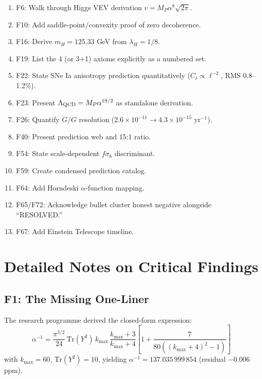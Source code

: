 \documentclass[11pt,a4paper]{article}
\begin{document}
\begin{enumerate}
\item F6: Walk through Higgs VEV derivation $v = M_P\alpha^8\sqrt{2\pi}$.
\item F10: Add saddle-point/convexity proof of zero decoherence.
\item F16: Derive $m_H = 125.33$ GeV from $\lambda_H = 1/8$.
\item F19: List the 4 (or 3+1) axioms explicitly as a numbered set.
\item F22: State SNe Ia anisotropy prediction quantitatively ($C_\ell \propto \ell^{-2}$, RMS 0.8--1.2\%).
\item F23: Present $\Lambda_{\rm QCD} = M_P\alpha^{19/2}$ as standalone derivation.
\item F26: Quantify $\dot{G}/G$ resolution ($2.6 \times 10^{-11} \to 4.3 \times 10^{-15}$ yr$^{-1}$).
\item F40: Present prediction web and 15:1 ratio.
\item F54: State scale-dependent $f\sigma_8$ discriminant.
\item F59: Create condensed prediction catalog.
\item F64: Add Horndeski $\alpha$-function mapping.
\item F65/F72: Acknowledge bullet cluster honest negative alongside ``RESOLVED.''
\item F67: Add Einstein Telescope timeline.
\end{enumerate}


\section{Detailed Notes on Critical Findings}

\subsection{F1: The Missing One-Liner}

The research programme derived the closed-form expression:
\begin{equation}
\alpha^{-1} = \frac{\pi^{3/2}}{24}\,\mathrm{Tr}(Y^2)\,k_{\max}\,\frac{k_{\max}+3}{k_{\max}+4}\left[1 + \frac{7}{80((k_{\max}+4)^2-1)}\right]
\end{equation}
with $k_{\max} = 60$, $\mathrm{Tr}(Y^2) = 10$, yielding $\alpha^{-1} = 137.035\,999\,854$ (residual $-0.006$ ppm).
\end{document}
